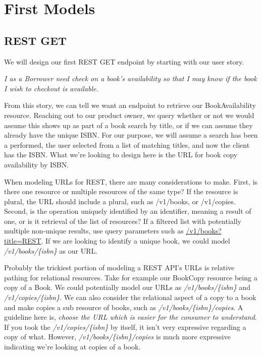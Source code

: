 \chapter{First Models}

\section{REST GET}

We will design our first REST GET endpoint by starting with our user story.

\textit{I as a Borrower need check on a book's availability so that I may know if the book I wish to checkout is available.}

From this story, we can tell we want an endpoint to retrieve our BookAvailability resource.  Reaching out to our product owner, we query whether or not we would assume this shows up as part of a book search by title, or if we can assume they already have the unique ISBN.  For our purpose, we will assume a search has been a performed, the user selected from a list of matching titles, and now the client has the ISBN.  What we're looking to design here is the URL for book copy availability by ISBN.

When modeling URLs for REST, there are many considerations to make.  First, is there one resource or multiple resources of the same type?  If the resource is plural, the URL should include a plural, such as /v1/books, or /v1/copies.  Second, is the operation uniquely identified by an identifier, meaning a result of one, or is it retrieval of the list of resources?  If a filtered list with potentially multiple non-unique results, use query parameters such as \url{/v1/books?title=REST}.  If we are looking to identify a unique book, we could model \textit{/v1/books/\{isbn\}} as our URL.

Probably the trickiest portion of modeling a REST API's URLs is relative pathing for relational resources.  Take for example our BookCopy resource being a copy of a Book.  We could potentially model our URLs as \textit{/v1/books/\{isbn\}} and \textit{/v1/copies/\{isbn\}}.  We can also consider the relational aspect of a copy to a book and make copies a sub resource of books, such as \textit{/v1/books/\{isbn\}/copies}.  A guideline here is, \textit{choose the URL which is easier for the consumer to understand}.  If you took the \textit{/v1/copies/\{isbn\}} by itself, it isn't very expressive regarding a copy of what.  However, \textit{/v1/books/\{isbn\}/copies} is much more expressive indicating we're looking at copies of a book.

